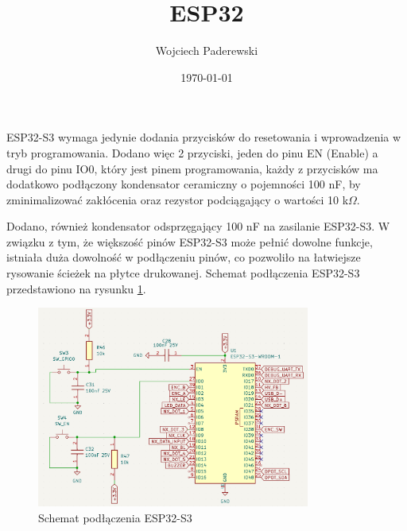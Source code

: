 \documentclass[../../main.tex]{subfiles}
\author{Wojciech Paderewski}
\date{\today}
\title{ESP32}
\begin{document}
ESP32-S3 wymaga jedynie dodania przycisków do resetowania i wprowadzenia w tryb programowania.
Dodano więc 2 przyciski, jeden do pinu EN (Enable) a drugi do pinu IO0, który jest pinem programowania,
każdy z przycisków ma dodatkowo podłączony kondensator ceramiczny o pojemności 100 nF, by zminimalizować zakłócenia oraz
rezystor podciągający o wartości 10 k$\Omega$.

Dodano, również kondensator odsprzęgający 100 nF na zasilanie ESP32-S3. W związku z tym, że większość pinów ESP32-S3 może 
pełnić dowolne funkcje, istniała duża dowolność w podłączeniu pinów, co pozwoliło na łatwiejsze rysowanie ścieżek na płytce drukowanej.
Schemat podłączenia ESP32-S3 przedstawiono na rysunku \ref{fig:esp32}.

\begin{figure}[H]
    \centering
    \includegraphics[width=0.8\textwidth]{ESP.png}
    \caption{Schemat podłączenia ESP32-S3}
    \label{fig:esp32}
\end{figure}
\end{document}

